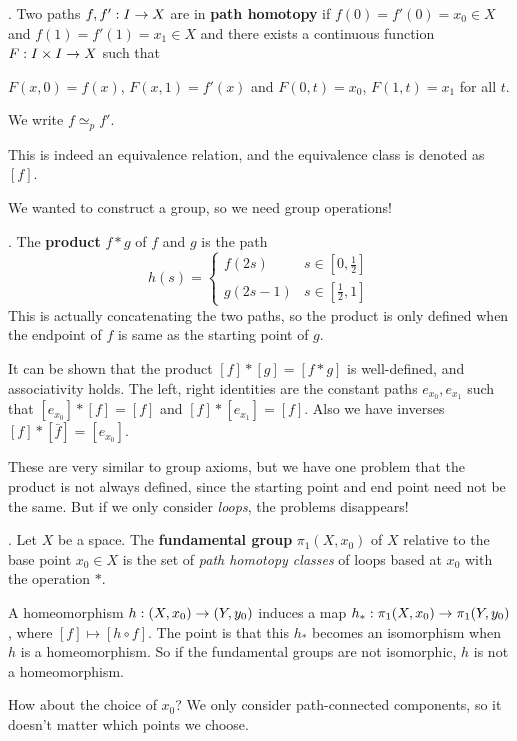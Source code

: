 . Two paths \(f, f' : I \rightarrow X\) are in \textbf{path homotopy} if \(f(0) = f'(0) = x_0 \in X\) and \(f(1) = f'(1) = x_1 \in X\) and there exists a continuous function \(F : I \times I \rightarrow X\) such that
\begin{center}
    \(F(x, 0) = f(x)\), \(F(x, 1) = f'(x)\) and \(F(0, t) = x_0\), \(F(1, t) = x_1\) for all \(t\).
\end{center}
We write \(f \simeq_p f'\).

This is indeed an equivalence relation, and the equivalence class is denoted as \([f]\).

We wanted to construct a group, so we need group operations!

. The \textbf{product} \(f * g\) of \(f\) and \(g\) is the path
\[
    h(s) = \begin{cases}
        f(2s) & s \in \left[0, \frac{1}{2}\right] \\ g(2s - 1) & s \in \left[\frac{1}{2}, 1\right]
    \end{cases}
\]
This is actually concatenating the two paths, so the product is only defined when the endpoint of \(f\) is same as the starting point of \(g\).

It can be shown that the product \([f] * [g] = [f * g]\) is well-defined, and associativity holds. The left, right identities are the constant paths \(e_{x_0}, e_{x_1}\) such that \([e_{x_0}] * [f] = [f]\) and \([f] * [e_{x_1}] = [f]\). Also we have inverses \([f] * [\bar{f}] = [e_{x_0}]\).

These are very similar to group axioms, but we have one problem that the product is not always defined, since the starting point and end point need not be the same. But if we only consider \textit{loops}, the problems disappears!

. Let \(X\) be a space. The \textbf{fundamental group} \(\pi_1(X, x_0)\) of \(X\) relative to the base point \(x_0 \in X\) is the set of \textit{path homotopy classes} of loops based at \(x_0\) with the operation \(*\).

A homeomorphism \(h: (X, x_0) \rightarrow (Y, y_0)\) induces a map \(h_* : \pi_1(X, x_0) \rightarrow \pi_1(Y, y_0)\), where \([f] \mapsto [h \circ f]\). The point is that this \(h_*\) becomes an isomorphism when \(h\) is a homeomorphism. So if the fundamental groups are not isomorphic, \(h\) is not a homeomorphism.

How about the choice of \(x_0\)? We only consider path-connected components, so it doesn't matter which points we choose.

